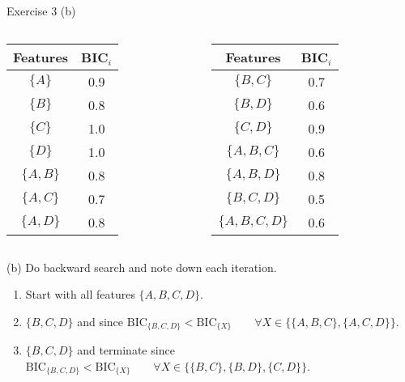 \documentclass[aspectratio=169]{beamer}
\newcommand{\BIC}[1]{\mathrm{BIC}_{\{#1\}}}
\begin{document}
\begin{frame}{Exercise 3 (b)}
	\begin{columns}
		\begin{column}{0.3\textwidth}
			\centering
			\begin{table}
				\centering
				\begin{tabular}{c c}
					Features & BIC$_i$ \\
					\hline
					$\{A\}$ & 0.9 \\
					$\{B\}$ & 0.8 \\
					$\{C\}$ & 1.0 \\
					$\{D\}$ & 1.0 \\
					$\{A, B\}$ & 0.8 \\
					$\{A, C\}$ & 0.7 \\
					$\{A, D\}$ & 0.8 \\
				\end{tabular}
			\end{table}
		\end{column}
		\begin{column}{0.3 \textwidth}
			\centering
			\begin{table}
				\centering
				\begin{tabular}{c c}
					Features & BIC$_i$ \\
					\hline					
					$\{B, C\}$ & 0.7 \\
					$\{B, D\}$ & 0.6 \\
					$\{C, D\}$ & 0.9 \\
					$\{A, B, C\}$ & 0.6 \\
					$\{A, B, D\}$ & 0.8 \\
					$\{B, C, D\}$ & 0.5 \\
					$\{A, B, C, D\}$ & 0.6 \\
				\end{tabular}
			\end{table}	
		\end{column}
		\hfill
	\end{columns}
	(b) Do backward search and note down each iteration.
	\begin{enumerate}
		\item<2-> Start with all features $\{A, B, C, D\}$.
		\item<3-> $\{B, C, D \}$ and since $\BIC{B, C, D} < \BIC{X} \qquad \forall X \in \{\{A, B, C\}, \{A, C, D\} \}$.
		\item<4-> $\{B, C, D \}$ and terminate since $\BIC{B, C, D} < \BIC{X} \qquad \forall X \in \{\{B, C\}, \{B, D\}, \{C, D\} \}$.
	\end{enumerate}
\end{frame}
\end{document}
